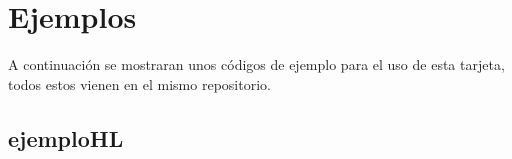\section{Ejemplos}
A continuación se mostraran unos códigos de ejemplo para el uso de esta tarjeta, todos estos vienen en el mismo repositorio.
\subsection{ejemplo\textunderscore HL}






